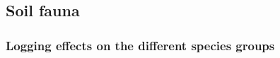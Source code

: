 

\subsection*{Soil fauna}
\label{disc:soil_fauna}


\subsubsection*{Logging effects on the different species groups}
\label{disc:logging_effects}

